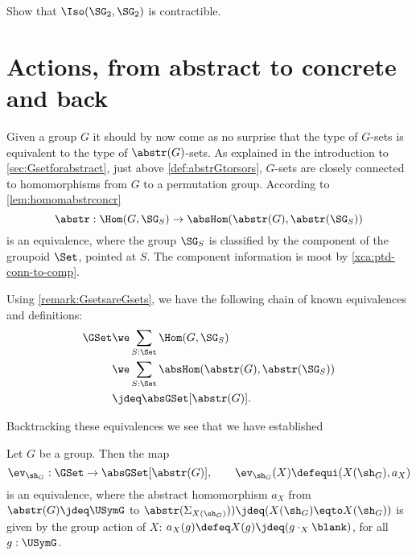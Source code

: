 \begin{xca}\label{xca:SG2=SG2-contractible} 
Show that $\Iso(\SG_2,\SG_2)$ is contractible.
\end{xca}

\section{Actions, from abstract to concrete and back}
\label{sec:Gsetsabstrconcr}

Given a group $G$ it should by now come as no surprise that the type 
of $G$-sets is equivalent to the type of $\abstr(G)$-sets.
As explained in the introduction to \cref{sec:Gsetforabstract},
just above \cref{def:abstrGtorsors}, $G$-sets are closely
connected to homomorphisms from $G$ to a permutation group.
According to \cref{lem:homomabstrconcr}
$$\abstr:\Hom(G,\SG_S)\to\absHom(\abstr(G),\abstr(\SG_S))$$
is an equivalence, where the group $\SG_S$ is classified by the 
component of the groupoid $\Set$, pointed at $S$. 
The component information is moot by \cref{xca:ptd-conn-to-comp}.

Using \cref{remark:GsetsareGsets},
we have the following chain of known equivalences and definitions:
\begin{align*}
\GSet 
&\we \sum_{S:\Set} \Hom(G,\SG_S) \\
&\we\sum_{S:\Set} \absHom(\abstr(G),\abstr(\SG_S)) \\
&\jdeq \absGSet[\abstr(G)].
\end{align*}

Backtracking these equivalences we see that we have established
\begin{lemma}\label{lem:actionsconcreteandabstract}
Let $G$ be a group. Then the map
\[
\ev_{\sh_G}:\GSet\to\absGSet[\abstr(G)],\qquad \ev_{\sh_G}(X)
\defequi(X(\sh_G),a_X)
\]
is an equivalence, where the abstract homomorphism $a_X$ from
$\abstr(G)\jdeq\USymG$ to 
$\abstr(\Sigma_{X(\sh_G)})) \jdeq (X(\sh_G)\eqto X(\sh_G))$ is given by
the group action of $X$: $a_X(g) \defeq X(g) \jdeq (g\cdot_X \blank)$,
for all $g:\USymG$.
\end{lemma}

